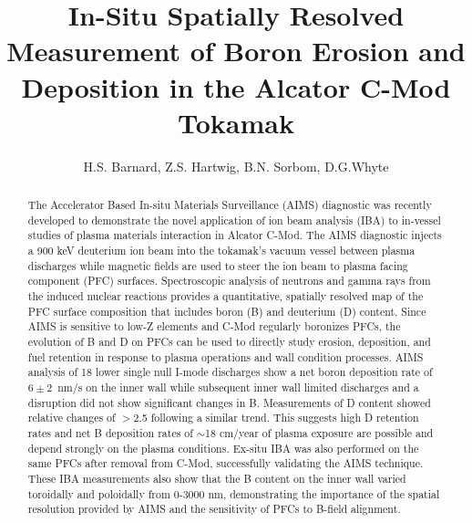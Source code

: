 \documentclass[final,3p,times,twocolumn]{elsarticle}
\begin{document}
\begin{frontmatter}

\title{In-Situ Spatially Resolved Measurement of Boron Erosion and Deposition in the Alcator C-Mod Tokamak}

\author{H.S. Barnard, Z.S. Hartwig, B.N. Sorbom, D.G.Whyte}


\begin{abstract}

The Accelerator Based In-situ Materials Surveillance (AIMS) diagnostic was recently developed to demonstrate the novel application of ion beam analysis (IBA) to in-vessel studies of plasma materials interaction in Alcator C-Mod. The AIMS diagnostic injects a 900 keV deuterium ion beam into the tokamak's vacuum vessel between plasma discharges while magnetic fields are used to steer the ion beam to plasma facing component (PFC) surfaces. Spectroscopic analysis of neutrons and gamma rays from the induced nuclear reactions provides a quantitative, spatially resolved map of the PFC surface composition that includes boron (B) and deuterium (D) content. Since AIMS is sensitive to low-Z elements and C-Mod regularly boronizes PFCs, the evolution of B and D on PFCs can be used to directly study erosion, deposition, and fuel retention in response to plasma operations and wall condition processes. AIMS analysis of 18 lower single null I-mode discharges show a net boron deposition rate of $6\pm2$~nm/s on the inner wall while subsequent inner wall limited discharges and a disruption did not show significant changes in B. Measurements of D content showed relative changes of $>$2.5 following a similar trend. This suggests high D retention rates and net B deposition rates of $\sim$18 cm/year of plasma exposure are possible and depend strongly on the plasma conditions. Ex-situ IBA was also performed on the same PFCs after removal from C-Mod, successfully validating the AIMS technique. These IBA measurements also show that the B content on the inner wall varied toroidally and poloidally from 0-3000 nm, demonstrating the importance of the spatial resolution provided by AIMS and the sensitivity of PFCs to B-field alignment.


\end{abstract}
\end{frontmatter}
\end{document}

